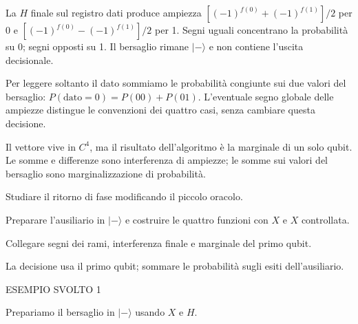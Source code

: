 La \(H\) finale sul registro dati produce ampiezza \([(- 1)^{f(0)}+(- 1)^{f(1)}]/2\) per 0 e \([(- 1)^{f(0)}- (- 1)^{f(1)}]/2\) per 1. Segni uguali concentrano la probabilità su 0; segni opposti su 1. Il bersaglio rimane \(|- \rangle \) e non contiene l'uscita decisionale.\par

Per leggere soltanto il dato sommiamo le probabilità congiunte sui due valori del bersaglio: \(P(\text{dato}=0)=P(00)+P(01)\). L'eventuale segno globale delle ampiezze distingue le convenzioni dei quattro casi, senza cambiare questa decisione.\par



Il vettore vive in \(C^{4}\), ma il risultato dell'algoritmo è la marginale di un solo qubit. Le somme e differenze sono interferenza di ampiezze; le somme sui valori del bersaglio sono marginalizzazione di probabilità.\par



Studiare il ritorno di fase modificando il piccolo oracolo.\par

Preparare l'ausiliario in \(|- \rangle \) e costruire le quattro funzioni con \(X\) e \(X\) controllata.\par

Collegare segni dei rami, interferenza finale e marginale del primo qubit.\par

La decisione usa il primo qubit; sommare le probabilità sugli esiti dell'ausiliario.\par


\Needspace{.36\textheight}\label{c3-deutsch-example-1}
{\sffamily\small\color{Accent} ESEMPIO SVOLTO 1\par}
Prepariamo il bersaglio in \(|- \rangle \) usando \(X\) e \(H\).\par


